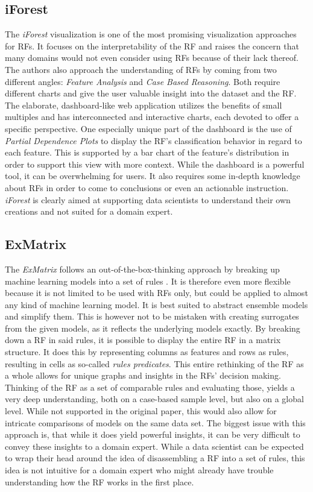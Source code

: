 \documentclass[a4paper, 12pt]{article}
\begin{document}
\subsection{iForest}
The \textit{iForest} visualization is one of the most promising visualization approaches for RFs.
\cite{zhao2018iforest} It focuses on the interpretability of the RF and raises the concern
that many domains would not even consider using RFs because of their lack thereof.
The authors also approach the understanding of RFs by coming from two different angles:
\textit{Feature Analysis} and \textit{Case Based Reasoning}.
Both require different charts and give the user valuable insight into the dataset and
the RF. The elaborate, dashboard-like web application utilizes the benefits
of small multiples and has interconnected and interactive charts, each devoted to offer a
specific perspective. One especially unique part of the dashboard is the use of
\textit{Partial Dependence Plots} to display the RF's classification behavior in regard to
each feature. This is supported by a bar chart of the feature's distribution in order to
support this view with more context.
While the dashboard is a powerful tool, it can be overwhelming for users. It also
requires some in-depth knowledge about RFs in order to come to conclusions or even an
actionable instruction. \textit{iForest} is clearly aimed at supporting data scientists to understand
their own creations and not suited for a domain expert.

\subsection{ExMatrix}
The \textit{ExMatrix} follows an out-of-the-box-thinking approach by breaking up machine
learning models into a set of rules \cite{neto2020explainable} \cite{ming2018rulematrix}.
It is therefore even more flexible because it is not limited
to be used with RFs only, but could be applied to almost any kind of machine learning model.
It is best suited to abstract ensemble models and simplify them. This is however not to be
mistaken with creating surrogates from the given models, as it reflects the underlying
models exactly. By breaking down a RF in said rules, it is possible to display the entire
RF in a matrix structure. It does this by representing columns as features and rows as rules, resulting in
cells as so-called \textit{rules predicates}. This entire rethinking of the RF as a whole allows for
unique graphs and insights in the RFs' decision making. Thinking of the RF as a set of
comparable rules and evaluating those, yields a very deep understanding, both on a
case-based sample level, but also on a global level. While not supported in the original
paper, this would also allow for intricate comparisons of models on the same data set.
The biggest issue with this approach is, that while it does yield powerful insights, it can
be very difficult to convey these insights to a domain expert. While a data scientist can be
expected to wrap their head around the idea of disassembling a RF into a set of rules, this
idea is not intuitive for a domain expert who might already have trouble understanding how
the RF works in the first place.
\end{document}

